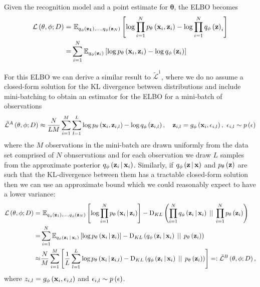 \documentclass[../report.tex]{subfiles}
\begin{document}
Given the recognition model and a point estimate for $\mathbf{\theta}$, the ELBO becomes
\begin{align}
  \mathcal{L} \left( \mathbf{\theta}, \phi; D\right) =& \,\, \mathbb{E}_{q_\phi \left( \mathbf{z_1}\right),...,q_\phi \left( \mathbf{z}_N\right)} \left[ \log \prod_{i=1}^{N} p_\mathbf{\theta} \left( \mathbf{x}_i, \mathbf{z}_i\right) - \log \prod_{i=1}^{N} q_\phi \left( \mathbf{z}\right)_i \right] \nonumber \\
  =& \sum_{i=1}^{N} \mathbb{E}_{q_\phi \left( \mathbf{z}_i\right)} \left[ \log p_\mathbf{\theta} \left( \mathbf{x}_i, \mathbf{z}_i\right) - \log q_\phi \left( \mathbf{z}_i\right) \right] \nonumber \\
\end{align}

For this ELBO we can derive a similar result to $\tilde{\mathcal{L}}^1$, where we do no assume a closed-form solution for the KL divergence between distributions and include mini-batching to obtain an estimator for the ELBO for a mini-batch of observations
\begin{equation}
  \tilde{\mathcal{L}}^A \left( \mathbf{\theta}, \phi; D\right) \approx \frac{N}{LM} \sum_{i=1}^{M} \sum_{l=1}^{L} \log p_\mathbf{\theta} \left( \mathbf{x}_i, \mathbf{z}_{i,l}\right) - \log q_\phi \left( \mathbf{z}_{i,l}\right), \quad \mathbf{z}_{i,l} = g_\phi \left( \mathbf{x}_i, \mathbf{\epsilon}_{i,l}\right),\,\, \mathbf{\epsilon}_{i,l} \sim p \left( \mathbf{\epsilon}\right)
\end{equation}
where the $M$ observations in the mini-batch are drawn uniformly from the data set comprised of $N$ obnservations and for each observation we draw $L$ samples from the approximate posterior $q_\phi \left(\mathbf{z}_i \, \middle\vert \, \mathbf{x}_i \right)$.
Similarly, if $q_\phi \left(\mathbf{z} \, \middle\vert \, \mathbf{x} \right)$ and $p_\mathbf{\theta} \left( \mathbf{z}\right)$ are such that the KL-divergence between them has a tractable closed-form solution then we can use an approximate bound which we could reasonably expect to have a lower variance:
\begin{align}
  \mathcal{L} \left( \mathbf{\theta}, \phi; D\right) =& \,\,\mathbb{E}_{q_\phi \left( \mathbf{z}_1\right),...,q_\phi \left( \mathbf{z}_N\right)} \left[ \log \prod_{i=1}^{N} p_\mathbf{\theta} \left(\mathbf{x}_i \, \middle\vert \, \mathbf{z}_i \right) \right] - \textrm{D}_{KL} \left( \prod_{i=1}^{N} q_\phi \left(\mathbf{z}_i \, \middle\vert \, \mathbf{x}_i \right) \, \mid \mid \, \prod_{i=1}^{N} p_\mathbf{\theta} \left( \mathbf{z}_i\right)\right) \nonumber \\
  =& \sum_{i=1}^{N} \mathbb{E}_{q_\phi \left(\mathbf{z}_i \, \middle\vert \, \mathbf{x}_i \right)} \left[ \log p_\mathbf{\theta} \left(\mathbf{x}_i \, \middle\vert \, \mathbf{z}_i \right) \right] - \textrm{D}_{KL} \left( q_\phi \left(\mathbf{z}_i \, \middle\vert \, \mathbf{x}_i \right) \, \mid \mid \, p_\mathbf{\theta} \left( \mathbf{z}_i\right)\right) \nonumber \\
  \approx& \frac{N}{M} \sum_{i=1}^{M} \left[ \frac{1}{L} \sum_{l=1}^{L} \log p_\mathbf{\theta} \left(\mathbf{x}_i \, \middle\vert \, \mathbf{z}_{i,l} \right) - \textrm{D}_{KL} \left( q_{\phi} \left(\mathbf{z}_i \, \middle\vert \, \mathbf{x}_i \right) \, \mid \mid \, p_\mathbf{\theta} \left( \mathbf{z}_i\right)\right) \right] =: \tilde{\mathcal{L}}^B \left( \mathbf{\theta}, \phi; D\right), \label{eqn:Lb}
\end{align}
where $z_{i,l} = g_\phi \left( \mathbf{x}_i, \mathbf{\epsilon}_{i,l}\right)$ and $\mathbf{\epsilon}_{i,l} \sim p \left( \mathbf{\epsilon}\right)$.
\end{document}
